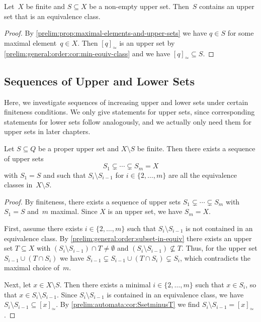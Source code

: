 \begin{corollary}
	Let~$X$ be finite and $S \subseteq X$ be a non-empty upper set.
	Then~$S$ contains an upper set that is an equivalence class.	
\end{corollary}
\begin{proof}
	By \cref{prelim:prop:maximal-elements-and-upper-sets} we 
	have $q \in S$ for some maximal element~$q \in X$.
	Then $[q]_{\simeq}$ is an upper set by \cref{prelim:general:order:cor:min-equiv-class}
	and we have $[q]_{\simeq} \subseteq S$.	
\end{proof} 

\subsection{Sequences of Upper and Lower Sets}
\label{prelim:general:order:sec:seq-upper-sets}

Here, we investigate sequences of increasing upper and lower sets
under certain finiteness conditions. We only give statements for upper sets,
since corresponding statements for lower sets follow analogously,
and we actually only need them for upper sets in later chapters.

\begin{proposition} \label{prelim:general:order:prop:seq-upper-sets}
	Let $S \subseteq Q$ be a proper upper set
	and $X \setminus S$ be finite.
	Then there exists a sequence of upper sets
	\[
	S_1 \subsetneq \cdots \subsetneq S_m = X
	\]
	with $S_1 = S$ and such that  $S_{i} \setminus S_{i-1}$ for $i \in \{2,\ldots,m\}$
	are all the equivalence classes in~$X \setminus S$.
\end{proposition}
\begin{proof}
	By finiteness, there exists a sequence
	of upper sets $S_1 \subsetneq \cdots \subsetneq S_m$
	with $S_1 = S$ and~$m$ maximal. Since $X$ is an upper set, we have $S_m = X$.
	
	First, assume there exists $i \in \{2,\ldots,m\}$ such that
	$S_{i} \setminus S_{i-1}$ is not contained in an equivalence
	class.
	By \cref{prelim:general:order:subset-in-equiv} there exists an upper set $T \subseteq X$
	with $( S_i \setminus S_{i-1} ) \cap T \ne \emptyset$
	and $( S_i \setminus S_{i-1} ) \not\subseteq T$.
	Thus, for the upper set $S_{i-1} \cup ( T  \cap S_i )$
	we have $S_{i-1} \subsetneq S_{i-1} \cup ( T  \cap S_i ) \subsetneq S_i$,
	which contradicts the maximal choice of~$m$.
	
	Next, let $x \in X \setminus S$. Then there exists a minimal $i \in \{2,\ldots,m\}$
	such that $x \in S_i$, so that $x \in S_i \setminus S_{i-1}$.
	Since $S_i \setminus S_{i-1}$ is contained in an equivalence
	class, we have $S_i \setminus S_{i-1} \subseteq [x]_{\simeq}$.
	By \cref{prelim:automata:cor:SsetminusT} 
	we find $S_i \setminus S_{i-1} = [x]_{\simeq}$.
\end{proof}

